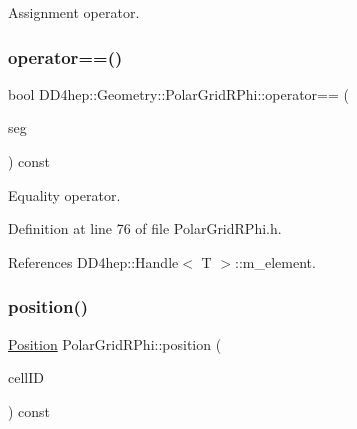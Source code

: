 Assignment operator. 

\hypertarget{class_d_d4hep_1_1_geometry_1_1_polar_grid_r_phi_ae3664aba8edb5800ce3334bcdeb9629b}{}\label{class_d_d4hep_1_1_geometry_1_1_polar_grid_r_phi_ae3664aba8edb5800ce3334bcdeb9629b} 
\subsubsection{\texorpdfstring{operator==()}{operator==()}}
{\footnotesize\ttfamily bool D\+D4hep\+::\+Geometry\+::\+Polar\+Grid\+R\+Phi\+::operator== (\begin{DoxyParamCaption}\item[{const \hyperlink{class_d_d4hep_1_1_geometry_1_1_polar_grid_r_phi}{Polar\+Grid\+R\+Phi} \&}]{seg }\end{DoxyParamCaption}) const\hspace{0.3cm}{\ttfamily [inline]}}



Equality operator. 



Definition at line 76 of file Polar\+Grid\+R\+Phi.\+h.



References D\+D4hep\+::\+Handle$<$ T $>$\+::m\+\_\+element.

\hypertarget{class_d_d4hep_1_1_geometry_1_1_polar_grid_r_phi_ad8dd167177762384cb8cc49a97ad965d}{}\label{class_d_d4hep_1_1_geometry_1_1_polar_grid_r_phi_ad8dd167177762384cb8cc49a97ad965d} 
\subsubsection{\texorpdfstring{position()}{position()}}
{\footnotesize\ttfamily \hyperlink{namespace_d_d4hep_1_1_geometry_a55083902099d03506c6db01b80404900}{Position} Polar\+Grid\+R\+Phi\+::position (\begin{DoxyParamCaption}\item[{const Cell\+ID \&}]{cell\+ID }\end{DoxyParamCaption}) const}



